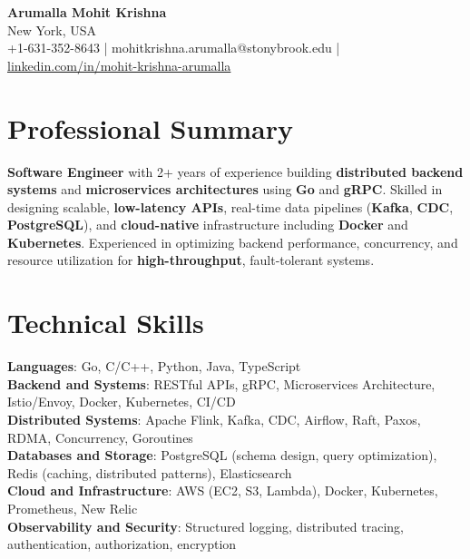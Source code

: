 \documentclass[letterpaper,11pt]{article}
\begin{document}
\begin{center}
  {\Large \textbf{Arumalla Mohit Krishna}} \\
  New York, USA \\
  +1-631-352-8643 \enspace | \enspace mohitkrishna.arumalla@stonybrook.edu \enspace | \enspace \href{https://www.linkedin.com/in/mohit-krishna-arumalla}{linkedin.com/in/mohit-krishna-arumalla}
\end{center}

\section{Professional Summary}
  \begin{itemize}[leftmargin=0.15in, label={}]
    \small{\item{
     \textbf{Software Engineer} with 2+ years of experience building \textbf{distributed backend systems} and \textbf{microservices architectures} using \textbf{Go} and \textbf{gRPC}. Skilled in designing scalable, \textbf{low-latency APIs}, real-time data pipelines (\textbf{Kafka}, \textbf{CDC}, \textbf{PostgreSQL}), and \textbf{cloud-native} infrastructure including \textbf{Docker} and \textbf{Kubernetes}. Experienced in optimizing backend performance, concurrency, and resource utilization for \textbf{high-throughput}, fault-tolerant systems.
    }}
  \end{itemize}
\vspace{-16pt}

\section{Technical Skills}
 \begin{itemize}[leftmargin=0.15in, label={}]
    \small{\item{
     \textbf{Languages}: Go, C/C++, Python, Java, TypeScript \\
     \textbf{Backend and Systems}: RESTful APIs, gRPC, Microservices Architecture, Istio/Envoy, Docker, Kubernetes, CI/CD \\
     \textbf{Distributed Systems}: Apache Flink, Kafka, CDC, Airflow, Raft, Paxos, RDMA, Concurrency, Goroutines \\
     \textbf{Databases and Storage}: PostgreSQL (schema design, query optimization), Redis (caching, distributed patterns), Elasticsearch \\
     \textbf{Cloud and Infrastructure}: AWS (EC2, S3, Lambda), Docker, Kubernetes, Prometheus, New Relic \\
     \textbf{Observability and Security}: Structured logging, distributed tracing, authentication, authorization, encryption
    }}
 \end{itemize}
\vspace{-16pt}
\end{document}
